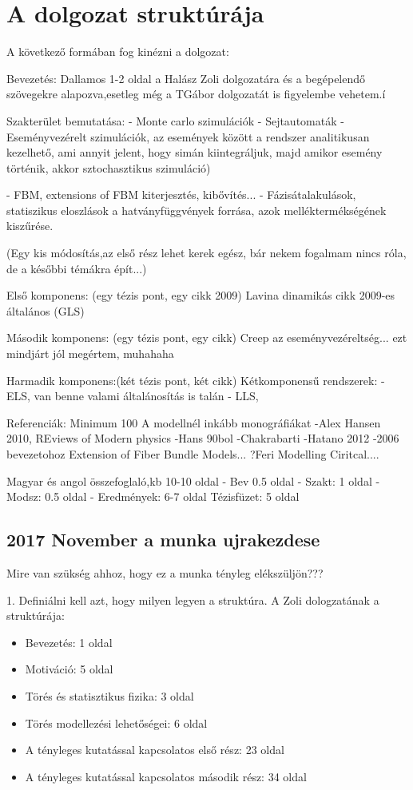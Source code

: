 \chapter{A dolgozat struktúrája}

A következő formában fog kinézni a dolgozat:

Bevezetés:
Dallamos 1-2 oldal a Halász Zoli dolgozatára és a begépelendő szövegekre alapozva,esetleg még a TGábor dolgozatát is figyelembe vehetem.í


Szakterület bemutatása:
- Monte carlo szimulációk
- Sejtautomaták
- Eseményvezérelt szimulációk, az események között a rendszer analitikusan kezelhető, ami annyit jelent, hogy simán kiintegráljuk, majd amikor esemény történik, akkor sztochasztikus szimuláció)

- FBM, extensions of FBM kiterjesztés, kibővítés...
- Fázisátalakulások, statiszikus eloszlások a hatványfüggvények forrása, azok melléktermékségének kiszűrése.


(Egy kis módosítás,az első rész lehet kerek egész, bár nekem fogalmam nincs róla, de a későbbi témákra épít...)

Első komponens: (egy tézis pont, egy cikk 2009)
Lavina dinamikás cikk 2009-es általános (GLS)

Második komponens: (egy tézis pont, egy cikk)
Creep az eseményvezéreltség... ezt mindjárt jól megértem, muhahaha

Harmadik komponens:(két tézis pont, két cikk)
Kétkomponensű rendszerek:
- ELS, van benne valami általánosítás is talán
- LLS,


Referenciák:
Minimum 100
A modellnél inkább monográfiákat
-Alex Hansen 2010, REviews of Modern physics
-Hans 90bol
-Chakrabarti
-Hatano 2012
-2006 bevezetohoz Extension of Fiber Bundle Models... ?Feri Modelling Ciritcal....

Magyar és angol összefoglaló,kb 10-10 oldal
- Bev 0.5 oldal
- Szakt: 1 oldal
- Modsz: 0.5 oldal
- Eredmények: 6-7 oldal
Tézisfüzet: 5 oldal


\section{2017 November a munka ujrakezdese}

Mire van szükség ahhoz, hogy ez a munka tényleg elékszüljön???

1. Definiálni kell azt, hogy milyen legyen a struktúra.
A Zoli dologzatának a struktúrája:
\begin{itemize}
  \item Bevezetés: 1 oldal
  \item Motiváció: 5 oldal
  \item Törés és statisztikus fizika: 3 oldal
  \item Törés modellezési lehetőségei: 6 oldal
  \item A tényleges kutatással kapcsolatos első rész: 23 oldal
  \item A tényleges kutatással kapcsolatos második rész: 34 oldal
\end{itemize}

